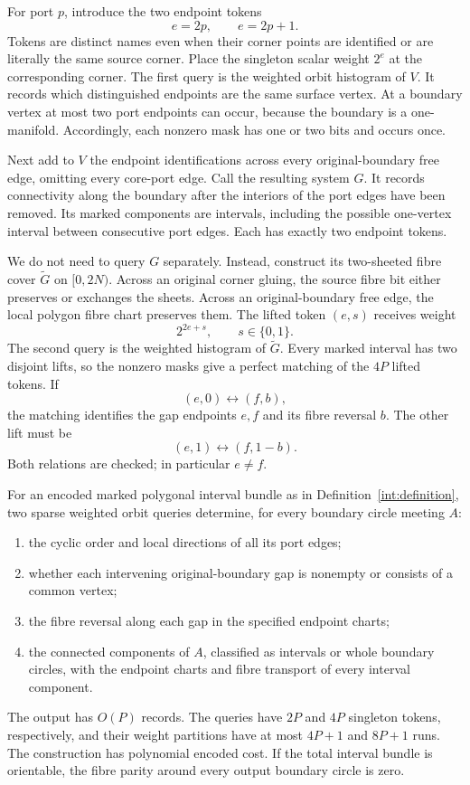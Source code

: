 For port $p$, introduce the two endpoint tokens
\[
                         e=2p,\qquad e=2p+1.
\]
Tokens are distinct names even when their corner points are identified or
are literally the same source corner.  Place the singleton scalar weight
$2^e$ at the corresponding corner.  The first query is the weighted orbit
histogram of $V$.  It records which distinguished endpoints are the same
surface vertex.  At a boundary vertex at most two port endpoints can occur,
because the boundary is a one-manifold.  Accordingly, each nonzero mask has
one or two bits and occurs once.

Next add to $V$ the endpoint identifications across every original-boundary
free edge, omitting every core-port edge.  Call the resulting system $G$.
It records connectivity along the boundary after the interiors of the port
edges have been removed.  Its marked components are intervals, including
the possible one-vertex interval between consecutive port edges.  Each has
exactly two endpoint tokens.

We do not need to query $G$ separately.  Instead, construct its two-sheeted
fibre cover $\widetilde G$ on $[0,2N)$.  Across an original corner gluing,
the source fibre bit either preserves or exchanges the sheets.  Across an
original-boundary free edge, the local polygon fibre chart preserves them.
The lifted token $(e,s)$ receives weight
\[
                              2^{2e+s},\qquad s\in\{0,1\}.
\]
The second query is the weighted histogram of $\widetilde G$.  Every marked
interval has two disjoint lifts, so the nonzero masks give a perfect
matching of the $4P$ lifted tokens.  If
\[
                            (e,0)\longleftrightarrow(f,b),
\]
the matching identifies the gap endpoints $e,f$ and its fibre reversal $b$.
The other lift must be
\[
                            (e,1)\longleftrightarrow(f,1-b).
\]
Both relations are checked; in particular $e\ne f$.

\begin{theorem}
\label{int:ordered}
For an encoded marked polygonal interval bundle as in
Definition~\ref{int:definition}, two sparse weighted orbit queries determine,
for every boundary circle meeting $A$:
\begin{enumerate}
\item the cyclic order and local directions of all its port edges;
\item whether each intervening original-boundary gap is nonempty or consists
of a common vertex;
\item the fibre reversal along each gap in the specified endpoint charts;
\item the connected components of $A$, classified as intervals or whole
boundary circles, with the endpoint charts and fibre transport of every
interval component.
\end{enumerate}
The output has $O(P)$ records.  The queries have $2P$ and $4P$ singleton
tokens, respectively, and their weight partitions have at most $4P+1$ and
$8P+1$ runs.  The construction has polynomial encoded cost.  If the total
interval bundle is orientable, the fibre parity around every output
boundary circle is zero.
\end{theorem}

